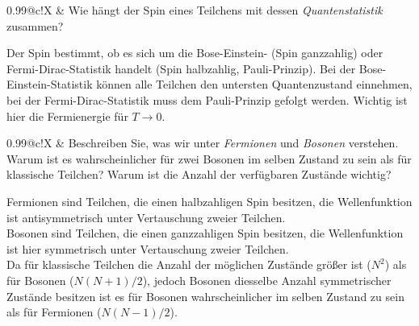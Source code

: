 \documentclass[a4paper,12pt]{scrartcl}
\makeatletter
\newcounter{qc}\setcounter{qc}{1}
\newenvironment{fshaded}{
\def\FrameCommand{\fcolorbox{framecolor}{shadecolor}}
\MakeFramed {\FrameRestore}}
{\endMakeFramed}
\def\frage#1{
\begin{fshaded}
\noindent
\begin{tabularx}{0.99\textwidth}{@{}c!{\color{framecolor}\vline}X}
{ \bf \rm \theqc }	&	\noindent #1
\end{tabularx}
\stepcounter{qc}
\end{fshaded}
}
\makeatother
\begin{document}


\frage{Wie hängt der Spin eines Teilchens mit dessen \textit{Quantenstatistik} zusammen?}
\noindent
Der Spin bestimmt, ob es sich um die Bose-Einstein- (Spin ganzzahlig) oder Fermi-Dirac-Statistik handelt (Spin halbzahlig, 
Pauli-Prinzip). Bei der Bose-Einstein-Statistik können alle Teilchen den untersten Quantenzustand einnehmen, bei der 
Fermi-Dirac-Statistik muss dem Pauli-Prinzip gefolgt werden. Wichtig ist hier die Fermienergie für $T \rightarrow 0$.



\frage{Beschreiben Sie, was wir unter \textit{Fermionen} und \textit{Bosonen} verstehen. Warum ist es wahrscheinlicher für 
zwei Bosonen im selben Zustand zu sein als für klassische Teilchen? Warum ist die Anzahl der verfügbaren Zustände wichtig?}
\noindent
Fermionen sind Teilchen, die einen halbzahligen Spin besitzen, die Wellenfunktion ist antisymmetrisch unter Vertauschung 
zweier Teilchen.\\

\noindent Bosonen sind Teilchen, die einen ganzzahligen Spin besitzen, die Wellenfunktion ist hier symmetrisch unter 
Vertauschung zweier Teilchen.\\

\noindent Da für klassische Teilchen die Anzahl der möglichen Zustände größer ist ($N^2$) als für Bosonen ($N(N+1)/2$), jedoch 
Bosonen diesselbe Anzahl symmetrischer Zustände besitzen ist es für Bosonen wahrscheinlicher im selben Zustand zu sein als für 
Fermionen ($N(N-1)/2$).

\end{document}
